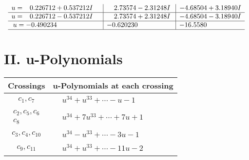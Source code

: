 \documentclass[1p]{elsarticle_modified}
\theoremstyle{definition}
\begin{document}
$$\begin{array}{c|c|c}
\begin{aligned}
u &= \phantom{-}0.226712 + 0.537212 I\end{aligned}
 & \phantom{-}2.73574 - 2.31248 I & -4.68504 + 3.18940 I \\ \hline\begin{aligned}
u &= \phantom{-}0.226712 - 0.537212 I\end{aligned}
 & \phantom{-}2.73574 + 2.31248 I & -4.68504 - 3.18940 I \\ \hline\begin{aligned}
u &= -0.490234\phantom{ +0.000000I}\end{aligned}
 & -0.620230\phantom{ +0.000000I} & -16.5580\phantom{ +0.000000I}\\
 \hline 
 \end{array}$$\newpage
\newpage\renewcommand{\arraystretch}{1}
\centering \section*{ II. u-Polynomials}
\begin{tabular}{m{50pt}|m{274pt}}
Crossings & \hspace{64pt}u-Polynomials at each crossing \\
\hline $$\begin{aligned}c_{1},c_{7}\end{aligned}$$&$\begin{aligned}
&u^{34}+u^{33}+\cdots- u-1
\end{aligned}$\\
\hline $$\begin{aligned}c_{2},c_{5},c_{6}\\c_{8}\end{aligned}$$&$\begin{aligned}
&u^{34}+7 u^{33}+\cdots+7 u+1
\end{aligned}$\\
\hline $$\begin{aligned}c_{3},c_{4},c_{10}\end{aligned}$$&$\begin{aligned}
&u^{34}- u^{33}+\cdots-3 u-1
\end{aligned}$\\
\hline $$\begin{aligned}c_{9},c_{11}\end{aligned}$$&$\begin{aligned}
&u^{34}+u^{33}+\cdots-11 u-2
\end{aligned}$\\
\hline
\end{tabular}\newpage\renewcommand{\arraystretch}{1}
\end{document}

